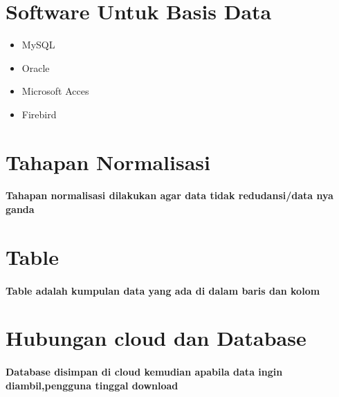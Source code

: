 \documentclass[10pt]{article}
\begin{document}
 \section*{Software Untuk Basis Data}
 \begin{itemize}
  \item MySQL
  \item Oracle
  \item Microsoft Acces
  \item Firebird
 \end{itemize}
 
\newpage
\section*{Tahapan Normalisasi}
\paragraph{Tahapan normalisasi dilakukan agar data tidak redudansi/data nya ganda}

\section*{Table}
\paragraph{Table adalah kumpulan data yang ada di dalam baris dan kolom}

\section*{Hubungan cloud dan Database}
\paragraph{Database disimpan di cloud kemudian apabila data ingin diambil,pengguna tinggal download}
\end{document}
